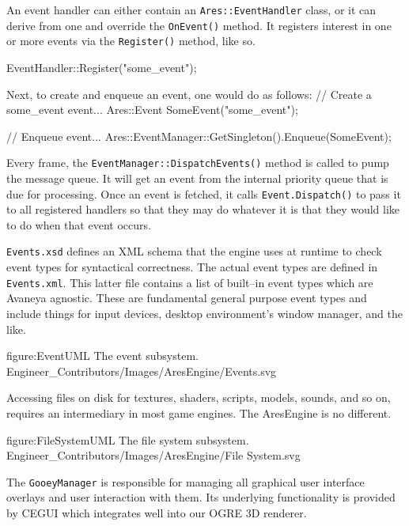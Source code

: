 An event handler can either contain an {\tt Ares::EventHandler} class, or it can derive from one and override the {\tt OnEvent()} method. It registers interest in one or more events via the {\tt Register()} method, like so.

\startCodeExample
EventHandler::Register("some_event");
\stopCodeExample

Next, to create and enqueue an event, one would do as follows:
\startCodeExample
// Create a some_event event...
Ares::Event SomeEvent("some_event");

// Enqueue event...
Ares::EventManager::GetSingleton().Enqueue(SomeEvent);
\stopCodeExample

Every frame, the {\tt EventManager::DispatchEvents()} method is called to pump the message queue. It will get an event from the internal priority queue that is due for processing. Once an event is fetched, it calls {\tt Event.Dispatch()} to pass it to all registered handlers so that they may do whatever it is that they would like to do when that event occurs.

{\tt Events.xsd} defines an XML schema that the engine uses at runtime to check event types for syntactical correctness. The actual event types are defined in {\tt Events.xml}. This latter file contains a list of built--in event types which are Avaneya agnostic. These are fundamental general purpose event types and include things for input devices, desktop environment's window manager, and the like.

\FullPageDiagram
    {figure:EventUML}
    {The event subsystem.}
    {Engineer_Contributors/Images/AresEngine/Events.svg}

\page 
{}
Accessing files on disk for textures, shaders, scripts, models, sounds, and so on, requires an intermediary in most game engines. The AresEngine is no different. %

\FullPageDiagram
    {figure:FileSystemUML}
    {The file system subsystem.}
    {Engineer_Contributors/Images/AresEngine/File System.svg}

\page 
{}
The {\tt GooeyManager} is responsible for managing all graphical user interface overlays and user interaction with them. Its underlying functionality is provided by CEGUI which integrates well into our OGRE 3D renderer.

